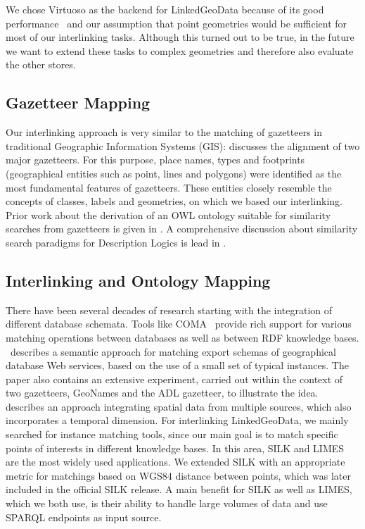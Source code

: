 We chose Virtuoso as the backend for LinkedGeoData because of its good
performance~\cite{BerlinSparql} and our assumption that point geometries
would be sufficient for most of our interlinking tasks. Although this turned
out to be true, in the future we want to extend these tasks to complex
geometries and therefore also evaluate the other stores.

\subsection{Gazetteer Mapping}

Our interlinking approach is very similar to the matching of gazetteers in
traditional Geographic Information Systems (GIS): \cite{gazetteer_core_elements}
discusses the alignment of two major gazetteers. For this
purpose, place names, types and footprints (geographical entities such as
point, lines and polygons) were identified as the most fundamental features of gazetteers.
These entities closely resemble the concepts of classes, labels and
geometries, on which we based our interlinking.
Prior work about the derivation of an OWL ontology suitable for similarity
searches from gazetteers is given in \cite{gazetteer_ontology}. 
A comprehensive discussion about similarity search paradigms
for Description Logics is lead in \cite{sim_ir}.

\subsection{Interlinking and Ontology Mapping}

There have been several decades of research starting with the integration of
different database schemata. Tools like COMA~\cite{coma} provide rich support
for various matching operations between databases as well as between RDF
knowledge bases. \cite{BraunerIFC07}~describes a semantic approach for matching
export schemas of geographical database Web services, based on the use of a
small set of typical instances. The paper also contains an extensive
experiment, carried out within the context of two gazetteers, GeoNames and the
ADL gazetteer, to illustrate the idea. \cite{conf/icdim/ManguinhasMB08}
describes an approach integrating spatial data from multiple sources, which also
incorporates a temporal dimension. For interlinking LinkedGeoData, we mainly
searched for instance matching tools, since our main goal is to match specific
points of interests in different knowledge bases. In this area,
SILK and LIMES are the most widely used applications. We extended
SILK with an appropriate metric for matchings based on WGS84 distance between
points, which was later included in the official SILK release. A main benefit
for SILK as well as LIMES, which we both use, is their ability to handle large
volumes of data and use SPARQL endpoints as input source.

